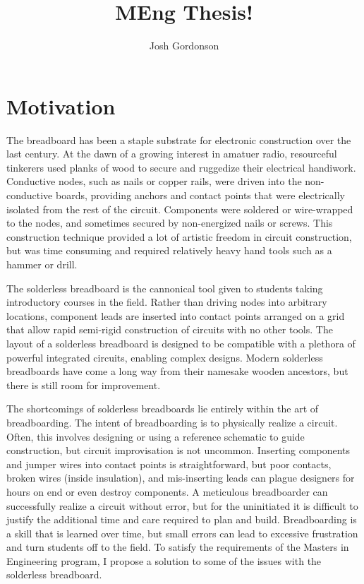 \documentclass[11pt, a4paper]{article}
\title{MEng Thesis!}
\author{Josh Gordonson}
\begin{document}
\maketitle

\section{Motivation}
The breadboard has been a staple substrate for electronic construction over the last century.
At the dawn of a growing interest in amatuer radio, resourceful tinkerers used planks of wood to secure and ruggedize their electrical handiwork.
Conductive nodes, such as nails or copper rails, were driven into the non-conductive boards, providing anchors and contact points that were electrically isolated from the rest of the circuit.
Components were soldered or wire-wrapped to the nodes, and sometimes secured by non-energized nails or screws.
This construction technique provided a lot of artistic freedom in circuit construction, but was time consuming and required relatively heavy hand tools such as a hammer or drill.

The solderless breadboard is the cannonical tool given to students taking introductory courses in the field.
Rather than driving nodes into arbitrary locations, component leads are inserted into contact points arranged on a grid that allow rapid semi-rigid construction of circuits with no other tools.
The layout of a solderless breadboard is designed to be compatible with a plethora of powerful integrated circuits, enabling complex designs.
Modern solderless breadboards have come a long way from their namesake wooden ancestors, but there is still room for improvement. 

The shortcomings of solderless breadboards lie entirely within the art of breadboarding.
The intent of breadboarding is to physically realize a circuit.
Often, this involves designing or using a reference schematic to guide construction, but circuit improvisation is not uncommon.
Inserting components and jumper wires into contact points is straightforward, but poor contacts, broken wires (inside insulation), and mis-inserting leads can plague designers for hours on end or even destroy components.
A meticulous breadboarder can successfully realize a circuit without error, but for the uninitiated it is difficult to justify the additional time and care required to plan and build.
Breadboarding is a skill that is learned over time, but small errors can lead to excessive frustration and turn students off to the field.
To satisfy the requirements of the Masters in Engineering program, I propose a solution to some of the issues with the solderless breadboard.
\end{document}
